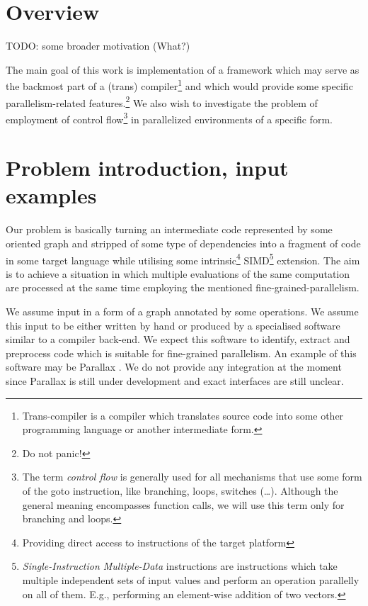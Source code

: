 
\section{Overview}

TODO: some broader motivation (What?)

The main goal of this work is implementation of a framework which may serve as the backmost part of a (trans) compiler\footnote{Trans-compiler is a compiler which translates source code into some other programming language or another intermediate form.} and which would provide some specific parallelism-related features.\footnote{Do not panic!} We also wish to investigate the problem of employment of control flow\footnote{The term \emph{control flow} is generally used for all mechanisms that use some form of the goto instruction, like branching, loops, switches (\dots). Although the general meaning encompasses function calls, we will use this term only for branching and loops.} in parallelized environments of a specific form.

\section{Problem introduction, input examples}

Our problem is basically turning an intermediate code represented by some oriented graph and stripped of some type of dependencies into a fragment of code in some target language while utilising some intrinsic\footnote{Providing direct access to instructions of the target platform} SIMD\footnote{\emph{Single-Instruction Multiple-Data} instructions are instructions which take multiple independent sets of input values and perform an operation parallelly on all of them. E.g., performing an element-wise addition of two vectors.} extension. The aim is to achieve a situation in which multiple evaluations of the same computation are processed at the same time employing the mentioned fine-grained-parallelism. 


We assume input in a form of a graph annotated by some operations. We assume this input to be either written by hand or produced by a specialised software similar to a compiler back-end. We expect this software to identify, extract and preprocess code which is suitable for fine-grained parallelism.  An example of this software may be Parallax \cite{parallax}. We do not provide any integration at the moment since Parallax is still under development and exact interfaces are still unclear.



